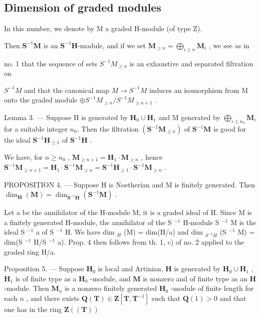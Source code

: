 \subsection{Dimension of graded modules}

In this number, we denote by M a graded H-module (of type Z).

Then \(\mathbf{S}^{-1}\mathbf{M}\) is an \(\mathbf{S}^{-1}\mathbf{H}\)-module, and if we set \(\mathbf{M}_{\geqslant n} = \bigoplus_{i\geqslant n}\mathbf{M}_i\) , we see as in

no. 1 that the sequence of sets \(S^{-1}M_{\geqslant n}\) is an exhaustive and separated filtration on

\(S^{-1}M\) and that the canonical map \(M \to S^{-1}M\) induces an isomorphism from M onto the graded module \(\oplus S^{-1}M_{\geqslant n}/S^{-1}M_{\geqslant n+1}\) .

Lemma 3. --- Suppose H is generated by \(\mathbf{H}_{0} \cup \mathbf{H}_{1}\) and M generated by \(\bigoplus_{i \leqslant n_{0}} \mathbf{M}_{i}\) for a suitable integer \(n_{0}\). Then the filtration \((\mathbf{S}^{-1}\mathbf{M}_{\geqslant n})\) of \(\mathbf{S}^{-1}\mathbf{M}\) is good for the ideal \(\mathbf{S}^{-1}\mathbf{H}_{\geqslant 1}\) of \(\mathbf{S}^{-1}\mathbf{H}\) .

We have, for \(n \geqslant n_0\) , \(\mathbf{M}_{\geqslant n+1} = \mathbf{H}_1 \cdot \mathbf{M}_{\geqslant n}\) , hence \(\mathbf{S}^{-1} \mathbf{M}_{\geqslant n+1} = \mathbf{H}_1 \cdot \mathbf{S}^{-1} \mathbf{M}_{\geqslant n} = \mathbf{S}^{-1} \mathbf{H}_{\geqslant 1} \cdot \mathbf{S}^{-1} \mathbf{M}_{\geqslant n}\) .

PROPOSITION 4. --- Suppose H is Noetherian and M is finitely generated. Then \(\dim_{\mathbf{H}}(\mathbf{M}) = \dim_{\mathbf{S}^{-1}\mathbf{H}}(\mathbf{S}^{-1}\mathbf{M})\) .

Let a be the annihilator of the H-module M; it is a graded ideal of H. Since M is a finitely generated H-module, the annihilator of the S \(^{-1}\) H-module S \(^{-1}\) M is the ideal S \(^{-1}\) a of S \(^{-1}\) H. We have dim \(_{H}\) (M) = dim(H/a) and dim \(_{S^{-1}H}\) (S \(^{-1}\) M) = dim(S \(^{-1}\) H/S \(^{-1}\) a). Prop. 4 then follows from th. 1, c) of no. 2 applied to the graded ring H/a.

Proposition 5. — Suppose \(\mathbf{H}_{0}\) is local and Artinian, \(\mathbf{H}\) is generated by \(\mathbf{H}_{0} \cup \mathbf{H}_{1}\) , \(\mathbf{H}_{1}\) is of finite type as a \(\mathbf{H}_{0}\) -module, and \(\mathbf{M}\) is nonzero and of finite type as an \(\mathbf{H}\) -module. Then \(\mathbf{M}_{n}\) is a nonzero finitely generated \(\mathbf{H}_{0}\) -module of finite length for each \(n\) , and there exists \(\mathbf{Q}(\mathbf{T}) \in \mathbf{Z}[\mathbf{T}, \mathbf{T}^{-1}]\) such that \(\mathbf{Q}(1) > 0\) and that one has in the ring \(\mathbf{Z}((\mathbf{T}))\)

